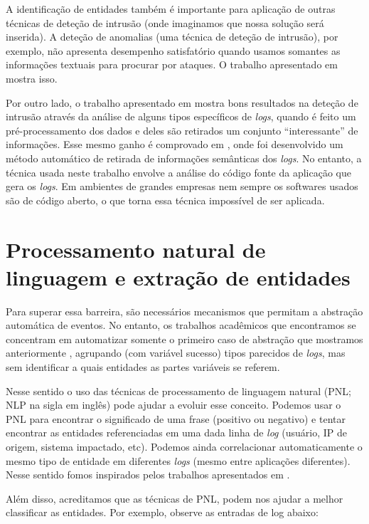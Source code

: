 \documentclass[
	12pt,				%
	openright,			%
	twoside,			%
	a4paper,			%
	english,			%
	spanish,			%
	brazil,				%
	]{abntex2}
\begin{document}
A identificação de entidades também é importante para aplicação de outras técnicas de deteção de intrusão (onde imaginamos que nossa solução será inserida). A deteção de anomalias (uma técnica de deteção de intrusão), por exemplo, não apresenta desempenho satisfatório quando usamos somantes as informações textuais para procurar por ataques. O trabalho apresentado em \cite{li2013automatic} mostra isso.

Por outro lado, o trabalho apresentado em \cite{yen2013beehive} mostra bons resultados na deteção de intrusão através da análise de alguns tipos específicos de \emph{logs}, quando é feito um pré-processamento dos dados e deles são retirados um conjunto ``interessante'' de informações. Esse mesmo ganho é comprovado em \cite{xu2009detecting}, onde foi desenvolvido um método automático de retirada de informações semânticas dos \emph{logs}. No entanto, a técnica usada neste trabalho envolve a análise do código fonte da aplicação que gera os \emph{logs}. Em ambientes de grandes empresas nem sempre os softwares usados são de código aberto, o que torna essa técnica impossível de ser aplicada.

\section{Processamento natural de linguagem e extração de entidades}
Para superar essa barreira, são necessários mecanismos que permitam a abstração automática de eventos. No entanto, os trabalhos acadêmicos que encontramos se concentram em automatizar somente o primeiro caso de abstração que mostramos anteriormente \cite{vaarandi2003data, nagappan2010abstracting}, agrupando (com variável sucesso) tipos parecidos de \emph{logs}, mas sem identificar a quais entidades as partes variáveis se referem.

Nesse sentido o uso das técnicas de processamento de linguagem natural (PNL; NLP na sigla em inglês) pode ajudar a evoluir esse conceito. Podemos usar o PNL para encontrar o significado de uma frase (positivo ou negativo) e tentar encontrar as entidades referenciadas em uma dada linha de \emph{log} (usuário, IP de origem, sistema impactado, etc). Podemos ainda correlacionar automaticamente o mesmo tipo de entidade em diferentes \emph{logs} (mesmo entre aplicações diferentes).  Nesse sentido fomos inspirados pelos trabalhos apresentados em \cite{matos2010environment, duque2012processo}.

Além disso, acreditamos que as técnicas de PNL, podem nos ajudar a melhor classificar as entidades. Por exemplo, observe as entradas de log abaixo:
\end{document}
